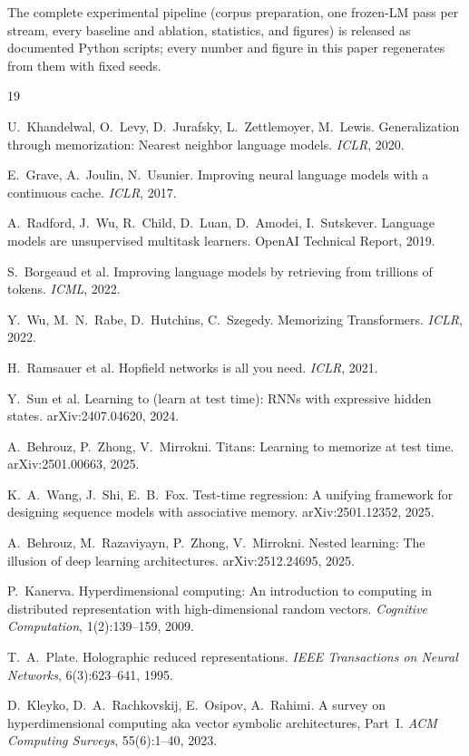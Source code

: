 \documentclass[11pt]{article}
\begin{document}
The complete experimental pipeline (corpus preparation, one frozen-LM pass per stream, every baseline and ablation, statistics, and figures) is released as documented Python scripts; every number and figure in this paper regenerates from them with fixed seeds.

\begin{thebibliography}{19}\small

 U.~Khandelwal, O.~Levy, D.~Jurafsky, L.~Zettlemoyer, M.~Lewis.
Generalization through memorization: Nearest neighbor language models. \emph{ICLR}, 2020.

 E.~Grave, A.~Joulin, N.~Usunier.
Improving neural language models with a continuous cache. \emph{ICLR}, 2017.

 A.~Radford, J.~Wu, R.~Child, D.~Luan, D.~Amodei, I.~Sutskever.
Language models are unsupervised multitask learners. OpenAI Technical Report, 2019.

 S.~Borgeaud et al.
Improving language models by retrieving from trillions of tokens. \emph{ICML}, 2022.

 Y.~Wu, M.~N.~Rabe, D.~Hutchins, C.~Szegedy.
Memorizing Transformers. \emph{ICLR}, 2022.

 H.~Ramsauer et al.
Hopfield networks is all you need. \emph{ICLR}, 2021.

 Y.~Sun et al.
Learning to (learn at test time): RNNs with expressive hidden states. arXiv:2407.04620, 2024.

 A.~Behrouz, P.~Zhong, V.~Mirrokni.
Titans: Learning to memorize at test time. arXiv:2501.00663, 2025.

 K.~A.~Wang, J.~Shi, E.~B.~Fox.
Test-time regression: A unifying framework for designing sequence models with associative memory. arXiv:2501.12352, 2025.

 A.~Behrouz, M.~Razaviyayn, P.~Zhong, V.~Mirrokni.
Nested learning: The illusion of deep learning architectures. arXiv:2512.24695, 2025.

 P.~Kanerva.
Hyperdimensional computing: An introduction to computing in distributed representation with high-dimensional random vectors. \emph{Cognitive Computation}, 1(2):139--159, 2009.

 T.~A.~Plate.
Holographic reduced representations. \emph{IEEE Transactions on Neural Networks}, 6(3):623--641, 1995.

 D.~Kleyko, D.~A.~Rachkovskij, E.~Osipov, A.~Rahimi.
A survey on hyperdimensional computing aka vector symbolic architectures, Part~I. \emph{ACM Computing Surveys}, 55(6):1--40, 2023.


\end{thebibliography}
\end{document}
